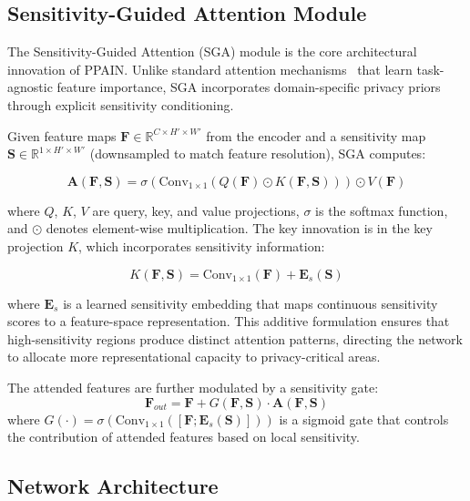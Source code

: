 \documentclass[preprint,12pt]{elsarticle}
\begin{document}
\subsection{Sensitivity-Guided Attention Module}

The Sensitivity-Guided Attention (SGA) module is the core architectural innovation of PPAIN. Unlike standard attention mechanisms~\cite{woo2018cbam,hu2018squeeze} that learn task-agnostic feature importance, SGA incorporates domain-specific privacy priors through explicit sensitivity conditioning.

Given feature maps $\mathbf{F} \in \mathbb{R}^{C \times H' \times W'}$ from the encoder and a sensitivity map $\mathbf{S} \in \mathbb{R}^{1 \times H' \times W'}$ (downsampled to match feature resolution), SGA computes:

\begin{equation}
\mathbf{A}(\mathbf{F}, \mathbf{S}) = \sigma\left(\text{Conv}_{1\times1}\left(Q(\mathbf{F}) \odot K(\mathbf{F}, \mathbf{S})\right)\right) \odot V(\mathbf{F})
\label{eq:sga}
\end{equation}

where $Q$, $K$, $V$ are query, key, and value projections, $\sigma$ is the softmax function, and $\odot$ denotes element-wise multiplication. The key innovation is in the key projection $K$, which incorporates sensitivity information:

\begin{equation}
K(\mathbf{F}, \mathbf{S}) = \text{Conv}_{1\times1}(\mathbf{F}) + \mathbf{E}_s(\mathbf{S})
\label{eq:key}
\end{equation}

where $\mathbf{E}_s$ is a learned sensitivity embedding that maps continuous sensitivity scores to a feature-space representation. This additive formulation ensures that high-sensitivity regions produce distinct attention patterns, directing the network to allocate more representational capacity to privacy-critical areas.

The attended features are further modulated by a sensitivity gate:
\begin{equation}
\mathbf{F}_{out} = \mathbf{F} + G(\mathbf{F}, \mathbf{S}) \cdot \mathbf{A}(\mathbf{F}, \mathbf{S})
\label{eq:gate}
\end{equation}
where $G(\cdot) = \sigma(\text{Conv}_{1\times1}([\mathbf{F}; \mathbf{E}_s(\mathbf{S})]))$ is a sigmoid gate that controls the contribution of attended features based on local sensitivity.

\subsection{Network Architecture}
\end{document}
